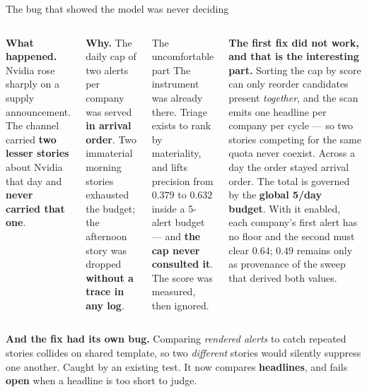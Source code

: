 \documentclass[aspectratio=169]{beamer}
\begin{document}
\begin{frame}{The bug that showed the model was never deciding}
\small
\begin{columns}[T]
\textbf{What happened.} Nvidia rose sharply on a supply announcement. The channel carried
\textbf{two lesser stories} about Nvidia that day and \textbf{never carried that one}.
\medskip

\textbf{Why.} The daily cap of two alerts per company was served \textbf{in arrival order}. Two
immaterial morning stories exhausted the budget; the afternoon story was dropped \textbf{without
a trace in any log}.
\begin{block}{\small The uncomfortable part}
\small The instrument was already there. Triage exists to rank by materiality, and lifts
precision from $0.379$ to $\mathbf{0.632}$ inside a 5-alert budget --- and \textbf{the cap never
consulted it}. The score was measured, then ignored.
\end{block}
\smallskip
{\footnotesize \textbf{The first fix did not work, and that is the interesting part.} Sorting the
cap by score can only reorder candidates present \emph{together}, and the scan emits one headline
per company per cycle --- so two stories competing for the same quota never coexist. Across a day
the order stayed arrival order. The total is governed by the \textbf{global 5/day budget}. With it
enabled, each company's first alert has no floor and the second must clear $0.64$; $0.49$ remains
only as provenance of the sweep that derived both values.}
\end{columns}
\vfill
{\footnotesize\textbf{And the fix had its own bug.} Comparing \emph{rendered alerts} to catch
repeated stories collides on shared template, so two \emph{different} stories would silently
suppress one another. Caught by an existing test. It now compares \textbf{headlines}, and fails
\textbf{open} when a headline is too short to judge.}
\end{frame}
\end{document}
